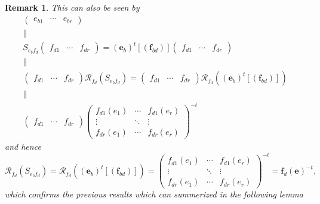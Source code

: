 \documentclass[aps,preprint]{revtex4}
\newtheorem{remark}[theorem]{Remark}
\begin{document}
\begin{remark}
This can also be seen by 
\begin{gather}
\left( 
\begin{array}{ccc}
e_{b1} & \cdots & e_{br}%
\end{array}%
\right) \\
\parallel \\
S_{e_{b}f_{d}}\left( 
\begin{array}{ccc}
f_{d1} & \cdots & f_{dr}%
\end{array}%
\right) =\left( \boldsymbol{e}_{b}\right) ^{t}\left[ \left( \boldsymbol{f}%
_{bd}\right) \right] \left( 
\begin{array}{ccc}
f_{d1} & \cdots & f_{dr}%
\end{array}%
\right) \\
\parallel \\
\left( 
\begin{array}{ccc}
f_{d1} & \cdots & f_{dr}%
\end{array}%
\right) \mathcal{R}_{f_{d}}\left( S_{e_{b}f_{d}}\right) =\left( 
\begin{array}{ccc}
f_{d1} & \cdots & f_{dr}%
\end{array}%
\right) \mathcal{R}_{f_{d}}\left( \overset{}{\left( \boldsymbol{e}%
_{b}\right) ^{t}\left[ \left( \boldsymbol{f}_{bd}\right) \right] }\right) \\
\parallel \\
\left( 
\begin{array}{ccc}
f_{d1} & \cdots & f_{dr}%
\end{array}%
\right) \left( 
\begin{array}{ccc}
f_{d1}\left( e_{1}\right) & \cdots & f_{d1}\left( e_{r}\right) \\ 
\vdots & \ddots & \vdots \\ 
f_{dr}\left( e_{1}\right) & \cdots & f_{dr}\left( e_{r}\right)%
\end{array}%
\right) ^{-t}
\end{gather}%
and hence%
\begin{equation}
\mathcal{R}_{f_{d}}\left( S_{e_{b}f_{d}}\right) =\mathcal{R}_{f_{d}}\left( 
\overset{}{\left( \boldsymbol{e}_{b}\right) ^{t}\left[ \left( \boldsymbol{f}%
_{bd}\right) \right] }\right) =\left( 
\begin{array}{ccc}
f_{d1}\left( e_{1}\right) & \cdots & f_{d1}\left( e_{r}\right) \\ 
\vdots & \ddots & \vdots \\ 
f_{dr}\left( e_{1}\right) & \cdots & f_{dr}\left( e_{r}\right)%
\end{array}%
\right) ^{-t}=\boldsymbol{f}_{d}\left( \boldsymbol{e}\right) ^{-t},
\end{equation}%
which confirms the previous results which can summerized in the following
lemma
\end{remark}
\end{document}
